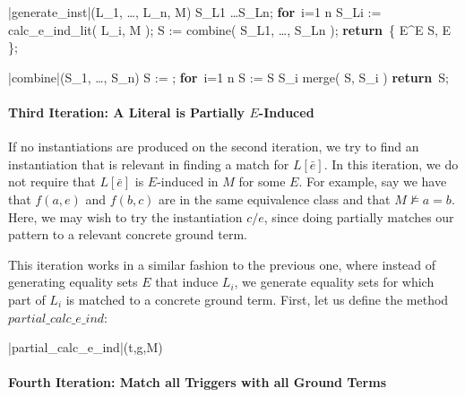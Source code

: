 \documentclass{llncs}
\def\RETURN{\keyword{return}\ }
\def\ENDPROC{\untab}
\def\DOFOR{\qtab\keyword{for}\ }
\def\ENDFOR{\untab}
\def\keyword#1{\mbox{\normalshape\bf #1}}
\begin{document}
\begin{minipage}[t]{.4\linewidth}
\begin{program}
\PROC |generate\_inst|(L_1, \ldots, L_n, M) \BODY
S_{L1} \ldots S_{Ln};
\DOFOR i=1 \TO n
  S_{Li} := calc\_e\_ind\_lit( L_i, M );
\ENDFOR
S := combine( S_{L1}, \ldots, S_{Ln} );
\RETURN \{ E^\varepsilon \mid E \in S, E  \};
\ENDPROC
\end{program}
\end{minipage}
\begin{minipage}[t]{.4\linewidth}
\begin{program}
\PROC |combine|(S_1, \ldots, S_n) \BODY
S := \emptyset;
\DOFOR i=1 \TO n
  S := S \cup S_i \cup merge( S, S_i )
\ENDFOR
\RETURN S;
\ENDPROC
\end{program}
\end{minipage}

\paragraph{Third Iteration: A Literal is Partially $E$-Induced}

If no instantiations are produced on the second iteration, we try to find an instantiation that is relevant in finding a match for $L[\bar{e}]$.
In this iteration, we do not require that $L[\bar{e}]$ is $E$-induced in $M$ for some $E$.
For example, say we have that $f( a, e )$ and $f( b, c )$ are in the same equivalence class and that $M \not\models a = b$.  
Here, we may wish to try the instantiation $c/e$, since doing partially matches our pattern to a relevant concrete ground term.

This iteration works in a similar fashion to the previous one, where instead of generating equality sets $E$ that induce $L_i$, we generate equality sets for which part of $L_i$ is matched to a concrete ground term.
First, let us define the method $partial\_calc\_e\_ind$:

\begin{minipage}[t]{.4\linewidth}
\begin{program}
\PROC |partial\_calc\_e\_ind|(t,g,M) \BODY
\ENDPROC
\end{program}
\end{minipage}


\paragraph{Fourth Iteration: Match all Triggers with all Ground Terms}
\end{document}
